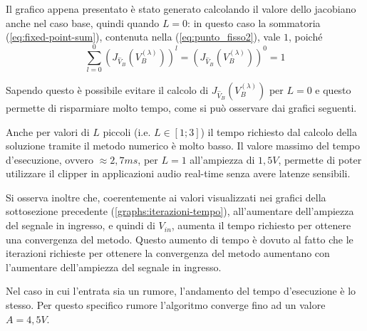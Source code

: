 			Il grafico appena presentato è stato generato calcolando il valore dello jacobiano anche nel caso base, quindi quando $L = 0$: in questo caso la sommatoria (\ref{eq:fixed-point-sum}), contenuta nella (\ref{eq:punto_fisso2}), vale $1$, poiché
			\[
				\sum_{l=0}^{0} \left(J_{\widehat V_{B}}(V_{B}^{(\lambda)})\right)^{l} = \left(J_{\widehat V_{B}}(V_{B}^{(\lambda)})\right)^{0} = 1
			\]
			
			Sapendo questo è possibile evitare il calcolo di $J_{\widehat V_{B}}(V_{B}^{(\lambda)})$ per $L = 0$ e questo permette di risparmiare molto tempo, come si può osservare dai grafici seguenti.
			
			\graficospace
			\graficospace
			\graficospace
			\graficospace
			\graficospace
			
			Anche per valori di $L$ piccoli (i.e. $L \in [1;3]$) il tempo richiesto dal calcolo della soluzione tramite il metodo numerico è molto basso. Il valore massimo del tempo d'esecuzione, ovvero $\approx 2,7ms$, per $L = 1$ all'ampiezza di $1,5V$, permette di poter utilizzare il clipper in applicazioni audio real-time senza avere latenze sensibili.
			
			Si osserva inoltre che, coerentemente ai valori visualizzati nei grafici della sottosezione precedente (\ref{graphs:iterazioni-tempo}), all'aumentare dell'ampiezza del segnale in ingresso, e quindi di $V_{in}$, aumenta il tempo richiesto per ottenere una convergenza del metodo. Questo aumento di tempo è dovuto al fatto che le iterazioni richieste per ottenere la convergenza del metodo aumentano con l'aumentare dell'ampiezza del segnale in ingresso.
			\pagebreak
			
			Nel caso in cui l'entrata sia un rumore, l'andamento del tempo d'esecuzione è lo stesso. Per questo specifico rumore l'algoritmo converge fino ad un valore $A = 4,5V$.
			
			\graficospace
			\graficospace
			\graficospace
			\graficospace